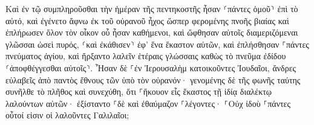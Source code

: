 \documentclass{openreader}
\begin{document}
Καὶ ἐν τῷ συμπληροῦσθαι τὴν ἡμέραν τῆς πεντηκοστῆς ἦσαν ⸂πάντες ὁμοῦ⸃ ἐπὶ τὸ αὐτό, 
καὶ ἐγένετο ἄφνω ἐκ τοῦ οὐρανοῦ ἦχος ὥσπερ φερομένης πνοῆς βιαίας καὶ ἐπλήρωσεν ὅλον τὸν οἶκον οὗ ἦσαν καθήμενοι, 
καὶ ὤφθησαν αὐτοῖς διαμεριζόμεναι γλῶσσαι ὡσεὶ πυρός, ⸂καὶ ἐκάθισεν⸃ ἐφ’ ἕνα ἕκαστον αὐτῶν, 
καὶ ἐπλήσθησαν ⸀πάντες πνεύματος ἁγίου, καὶ ἤρξαντο λαλεῖν ἑτέραις γλώσσαις καθὼς τὸ πνεῦμα ἐδίδου ⸂ἀποφθέγγεσθαι αὐτοῖς⸃. 
Ἦσαν δὲ ⸀ἐν Ἰερουσαλὴμ κατοικοῦντες Ἰουδαῖοι, ἄνδρες εὐλαβεῖς ἀπὸ παντὸς ἔθνους τῶν ὑπὸ τὸν οὐρανόν· 
γενομένης δὲ τῆς φωνῆς ταύτης συνῆλθε τὸ πλῆθος καὶ συνεχύθη, ὅτι ⸀ἤκουον εἷς ἕκαστος τῇ ἰδίᾳ διαλέκτῳ λαλούντων αὐτῶν· 
ἐξίσταντο ⸀δὲ καὶ ἐθαύμαζον ⸀λέγοντες· ⸀Οὐχ ἰδοὺ ⸀πάντες οὗτοί εἰσιν οἱ λαλοῦντες Γαλιλαῖοι; 
\end{document}
